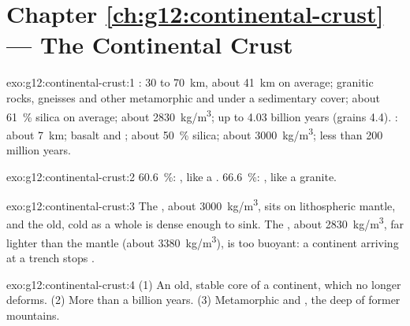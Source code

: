 \section*{Chapter \ref{ch:g12:continental-crust} --- The Continental Crust}

\begin{solution}{exo:g12:continental-crust:1}
: 30 to \qty{70}{km}, about \qty{41}{km} on average;
granitic rocks, gneisses and other metamorphic and  under a
sedimentary cover; about \qty{61}{\percent} silica on average; about
\qty{2830}{kg/m^3}; up to 4.03 billion years (grains 4.4). :
about \qty{7}{km}; basalt and ; about \qty{50}{\percent} silica; about
\qty{3000}{kg/m^3}; less than 200 million years.
\end{solution}

\begin{solution}{exo:g12:continental-crust:2}
\qty{60.6}{\percent}: , like a . \qty{66.6}{\percent}:
, like a granite.
\end{solution}

\begin{solution}{exo:g12:continental-crust:3}
The , about \qty{3000}{kg/m^3}, sits on lithospheric mantle,
and the old, cold  as a whole is dense enough to sink.
The , about \qty{2830}{kg/m^3}, far lighter than the mantle
(about \qty{3380}{kg/m^3}), is too buoyant: a continent arriving at a trench
stops .
\end{solution}

\begin{solution}{exo:g12:continental-crust:4}
(1) An old, stable core of a continent, which no longer deforms. (2) More
than a billion years. (3) Metamorphic and , the deep  of
former mountains.
\end{solution}

